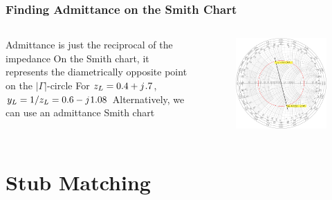 \documentclass[10pt, compress]{beamer}
\renewcommand{\j}{{j}\mkern1mu} %
\begin{document}
\begin{frame}
    \frametitle{Finding Admittance on the Smith Chart}
    \begin{columns}[T]
        \begin{column}[]{.4\textwidth}
            \begin{outline}
                \1 Admittance is just the reciprocal of the impedance
                \1 On the Smith chart, it represents the diametrically opposite point on the $|\Gamma|$-circle
                \1 For $z_L = 0.4 + \j .7$, $y_L = 1/z_L = 0.6 - \j 1.08 $
                \1 Alternatively, we can use an admittance Smith chart
            \end{outline}
        \end{column}
        \begin{column}[]{.6\textwidth}
            \begin{figure}[T!]
                \centering
                \includegraphics[width=.9\textwidth]{smith example admittance.pdf}
            \end{figure}
        \end{column}
    \end{columns}



\end{frame}



\section{Stub Matching}
\end{document}
